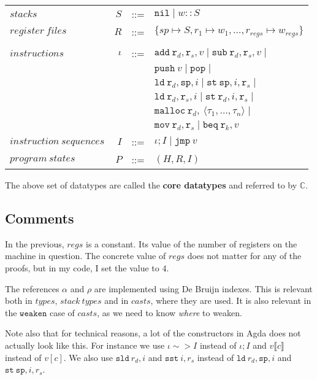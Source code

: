 \begin{tabular}{lrcl}
$stacks$ & $S$ & ::= & $\mathtt{nil} \mid w :: S$ \\
$register\ files$ & $R$ & ::= & $\{sp \mapsto S, r_1 \mapsto w_1, \dots, r_{regs} \mapsto w_{regs}\}$ \\
\\
$instructions$ & $\iota$ & ::= & $\mathtt{add}\ \mathtt{r}_d, \mathtt{r}_s, v \mid \mathtt{sub}\ \mathtt{r}_d, \mathtt{r}_s, v \mid$ \\
        &&& $\mathtt{push}\ v \mid \mathtt{pop} \mid$ \\
        &&& $\mathtt{ld}\ \mathtt{r}_d, \mathtt{sp}, i \mid \mathtt{st}\ \mathtt{sp}, i, \mathtt{r}_s \mid$\\
        &&& $\mathtt{ld}\ \mathtt{r}_d, \mathtt{r}_s, i \mid \mathtt{st}\ \mathtt{r}_d, i, \mathtt{r}_s \mid$\\
        &&& $\mathtt{malloc}\ \mathtt{r}_d,\ \langle \tau_1, \dots, \tau_n \rangle \mid $ \\
        &&& $\mathtt{mov}\ \mathtt{r}_d, \mathtt{r}_s \mid \mathtt{beq}\ \mathtt{r}_k, v$ \\
$instruction\ sequences$ & $I$ & ::= & $\iota ; I \mid \mathtt{jmp}\ v$ \\
$program\ states$ & $P$ & ::= & $(H, R, I)$ \\
\end{tabular}

\begin{definition}
  The above set of datatypes are called the \textbf{core datatypes} and referred
  to by $\mathbb{C}$.
\end{definition}

\subsection{Comments}
In the previous, $regs$ is a constant. Its value of the number of registers on
the machine in question. The concrete value of $regs$ does not matter for any of
the proofs, but in my code, I set the value to $4$.

The references $\alpha$ and $\rho$ are implemented using De Bruijn indexes. This
is relevant both in $types$, $stack\ types$ and in $casts$, where they are
used. It is also relevant in the $\mathtt{weaken}$ case of $casts$, as we need
to know \emph{where} to weaken.

Note also that for technical reasons, a lot of the constructors in Agda does not
actually look like this. For instance we use $\iota \sim> I$ instead of
$\iota ; I$ and $v \llbracket c \rrbracket$ instead of $v [ c ]$. We also use
$\mathtt{sld}\ r_d, i$ and $\mathtt{sst}\ i, r_s$ instead of
$\mathtt{ld}\ r_d, \mathtt{sp}, i$ and $\mathtt{st}\ \mathtt{sp}, i, r_s$.

